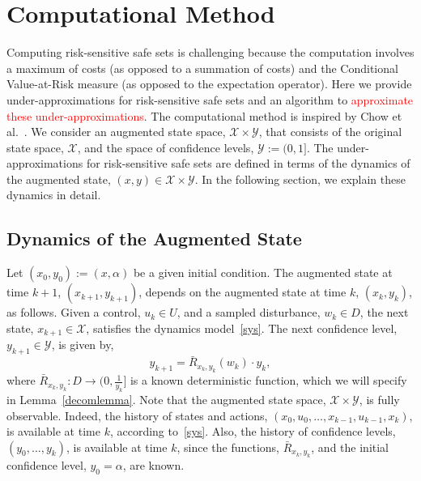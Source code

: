 \documentclass[letterpaper, 10 pt, conference]{ieeeconf}  %
\begin{document}

\section{Computational Method}
\label{sec::alg}
Computing risk-sensitive safe sets is challenging because the computation involves a maximum of costs (as opposed to a summation of costs)
and the Conditional Value-at-Risk measure (as opposed to the expectation operator). Here we provide under-approximations 
for risk-sensitive safe sets and an algorithm to \textcolor{red}{approximate these under-approximations}. 
The computational method is inspired by Chow et al.~\cite{chow2015risk}.
We consider an augmented state space, $\mathcal{X} \times \mathcal{Y}$, that consists of the original state space, $\mathcal{X}$, 
and the space of confidence levels, $\mathcal{Y} := (0,1]$.
The under-approximations for risk-sensitive safe sets are defined in terms of the dynamics of the augmented state, $(x,y) \in \mathcal{X} \times \mathcal{Y}$. 
In the following section, we explain these dynamics in detail.

\subsection{Dynamics of the Augmented State}
Let $(x_0, y_0) := (x, \alpha)$ be a given initial condition.
The augmented state at time $k+1$, $(x_{k+1}, y_{k+1})$, depends on the augmented state at time $k$, $(x_k, y_k)$, as follows.
Given a control, $u_k \in U$, and a sampled disturbance, $w_k \in D$, the next state, $x_{k+1} \in \mathcal{X}$, satisfies the dynamics model~\eqref{sys}. 
The next confidence level, $y_{k+1} \in \mathcal{Y}$, is given by,
\begin{equation}
y_{k+1} = \bar{R}_{x_k,y_k}(w_k) \cdot y_k,\label{Rbar}
\end{equation}
where $\bar{R}_{x_k, y_k} : D \to (0, \frac{1}{y_k}]$ is a known deterministic function, 
which we will specify in Lemma~\ref{decomlemma}. 
Note that the augmented state space, $\mathcal{X} \times \mathcal{Y}$, is fully observable.
Indeed, the history of states and actions, $(x_0, u_0, \hdots, x_{k-1}, u_{k-1}, x_{k})$, is available at time $k$, according to~\eqref{sys}. 
Also, the history of confidence levels, $(y_0, \hdots, y_k)$, is available at time $k$, since
the functions, $\bar{R}_{x_k,y_k}$, and the initial confidence level, $y_0 = \alpha$, are known.
\end{document}
